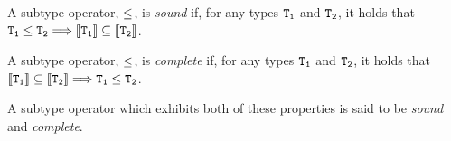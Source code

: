\begin{definition} A subtype operator, ${\tt\le}$, is {\em sound} if, for any types ${\tt T_1}$ and ${\tt T_2}$, it holds that ${\tt T_1\le T_2\Longrightarrow \llbracket T_1\rrbracket\subseteq \llbracket T_2\rrbracket}$.
\end{definition}

\begin{definition} A subtype operator, ${\tt\le}$, is {\em complete} if, for any types ${\tt T_1}$ and ${\tt T_2}$, it holds that ${\tt \llbracket T_1\rrbracket\subseteq\llbracket T_2\rrbracket\Longrightarrow T_1\le T_2}$.
\end{definition}

\noindent A subtype operator which exhibits both of these properties is said to be {\em sound} and {\em complete}.  